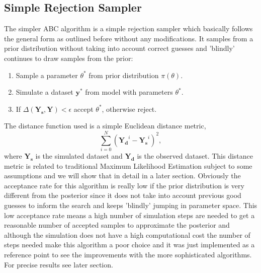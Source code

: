 \documentclass[12pt,a4paper,titlepage]{article}
\begin{document}
\subsection{Simple Rejection Sampler}
\label{sec:rejection_sampler}
The simpler ABC algorithm is a simple rejection sampler\cite{pritchard1999population} which basically follows the general form as outlined before without any modifications. It samples from a prior distribution without taking into account correct guesses and 'blindly' continues to draw samples from the prior:
\begin{enumerate}[noitemsep]
\item{Sample a parameter $\theta ^*$ from prior distribution $\pi(\theta)$.}
\item{Simulate a dataset $\mathbf{y}^*$  from model with parameters $\theta ^*$.}
\item{If $\Delta(\mathbf{Y_{s}}, \mathbf{Y}) < \epsilon$ accept $\theta^*$, otherwise reject.}
\end{enumerate}
The distance function used is a simple Euclidean distance metric,
\begin{equation}
\sum_{i=0}^{N} (\mathbf{Y_{d}}^{i} -\mathbf{Y_{s}}^{i})^2,
\end{equation}
where $\mathbf{Y_{s}}$ is the simulated dataset and $\mathbf{Y_{d}}$ is the observed dataset. This distance metric is related to traditional Maximum Likelihood Estimation subject to some assumptions and we will show that in detail in a later section. Obviously the acceptance rate for this algorithm is really low if the prior distribution is very different from the posterior since it does not take into account previous good guesses to inform the search and keeps 'blindly' jumping in parameter space. This low acceptance rate means a high number of simulation steps are needed to get a reasonable number of accepted samples to approximate the posterior and although the simulation does not have a high computational cost the number of steps needed make this algorithm a poor choice and it was just implemented as a reference point to see the improvements with the more sophisticated algorithms. For precise results see later section.
\end{document}
